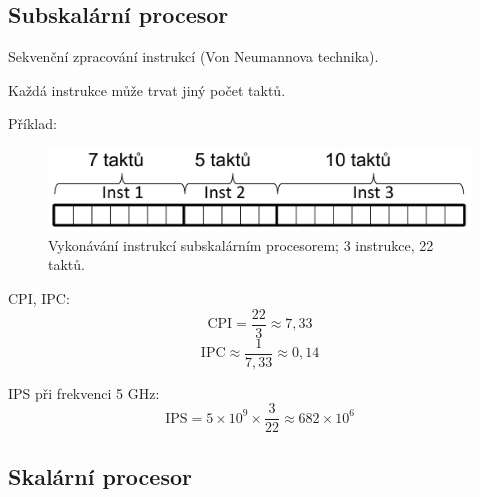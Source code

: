 \subsection{Subskalární procesor}

\begin{compactitem}
    \item Sekvenční zpracování instrukcí (Von Neumannova technika).
    \item Každá instrukce může trvat jiný počet taktů.

    \item Příklad:
    \begin{figure}[H]
        \centering
        \includegraphics[width=0.75\linewidth]{subscalar.pdf}
        \caption{Vykonávání instrukcí subskalárním procesorem; 3 instrukce, 22 taktů.}
    \end{figure}

    \begin{compactitem}
        \item CPI, IPC:
        $$ \text{CPI} = \frac{22}{3} \approx 7,33 $$
        $$ \text{IPC} \approx \frac{1}{7,33} \approx 0,14 $$
        \item IPS při frekvenci 5 GHz:
        $$ \text{IPS} = 5 \times 10^9 \times \frac{3}{22} \approx 682 \times 10^6 $$
    \end{compactitem}
\end{compactitem}

\subsection{Skalární procesor}

